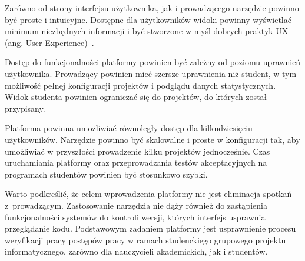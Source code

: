 Zarówno od strony interfejsu użytkownika, jak i prowadzącego narzędzie powinno być proste i intuicyjne.
Dostępne dla użytkowników widoki powinny wyświetlać minimum niezbędnych informacji i być stworzone w myśl dobrych praktyk UX (ang. User Experience)~\cite{ux-good-practicies}.

Dostęp do funkcjonalności platformy powinien być zależny od poziomu uprawnień użytkownika.
Prowadzący powinien mieć szersze uprawnienia niż student, w tym możliwość pełnej konfiguracji projektów i podglądu danych statystycznych.
Widok studenta powinien ograniczać się do projektów, do których został przypisany.

Platforma powinna umożliwiać równoległy dostęp dla kilkudziesięciu użytkowników.
Narzędzie powinno być skalowalne i proste w konfiguracji tak, aby umożliwiać w przyszłości prowadzenie kilku projektów jednocześnie.
Czas uruchamiania platformy oraz przeprowadzania testów akceptacyjnych na programach studentów powinien być stosunkowo szybki.

Warto podkreślić, że celem wprowadzenia platformy nie jest eliminacja spotkań z~prowadzącym.
Zastosowanie narzędzia nie dąży również do zastąpienia funkcjonalności systemów do kontroli wersji, których interfejs usprawnia przeglądanie kodu.
Podstawowym zadaniem platformy jest usprawnienie procesu weryfikacji pracy postępów pracy w ramach studenckiego grupowego projektu informatycznego, zarówno dla nauczycieli akademickich, jak i studentów.






